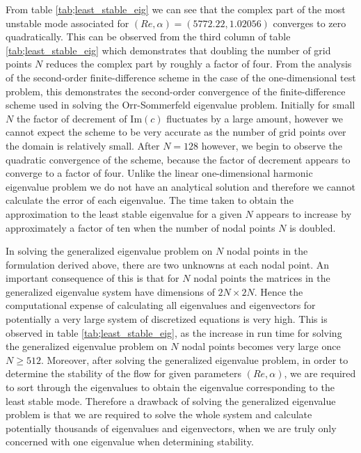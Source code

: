 \documentclass[a4paper, 12pt, twoside, openright]{article}
\numberwithin{equation}{section}
\begin{document}
%
%
%
%
From table \ref{tab;least_stable_eig} we can see that the complex part of the most unstable mode associated for $(Re,\alpha)=(5772.22,1.02056)$ converges to zero quadratically. This can be observed from the third column of table \ref{tab;least_stable_eig} which demonstrates that doubling the number of grid points $N$ reduces the complex part by roughly a factor of four. From the analysis of the second-order finite-difference scheme in the case of the one-dimensional test problem, this demonstrates the second-order convergence of the finite-difference scheme used in solving the Orr-Sommerfeld eigenvalue problem. Initially for small $N$ the factor of decrement of $\mathrm{Im}(c)$ fluctuates by a large amount, however we cannot expect the scheme to be very accurate as the number of grid points over the domain is relatively small. After $N=128$ however, we begin to observe the quadratic convergence of the scheme, because the factor of decrement appears to converge to a factor of four. Unlike the linear one-dimensional harmonic eigenvalue problem we do not have an analytical solution and therefore we cannot calculate the error of each eigenvalue. The time taken to obtain the approximation to the least stable eigenvalue for a given $N$ appears to increase by approximately a factor of ten when the number of nodal points $N$ is doubled. %

In solving the generalized eigenvalue problem on $N$ nodal points in the formulation derived above, there are two unknowns at each nodal point. An important consequence of this is that for $N$ nodal points the matrices in the generalized eigenvalue system have dimensions of $2N\times 2N$. Hence the computational expense of calculating all eigenvalues and eigenvectors for potentially a very large system of discretized equations is very high. This is observed in table \ref{tab;least_stable_eig}, as the increase in run time for solving the generalized eigenvalue problem on $N$ nodal points becomes very large once $N\geq 512$. Moreover, after solving the generalized eigenvalue problem, in order to determine the stability of the flow for given parameters $(Re,\alpha)$, we are required to sort through the eigenvalues to obtain the eigenvalue corresponding to the least stable mode. Therefore a drawback of solving the generalized eigenvalue problem is that we are required to solve the whole system and calculate potentially thousands of eigenvalues and eigenvectors, when we are truly only concerned with one eigenvalue when determining stability. %
\end{document}
